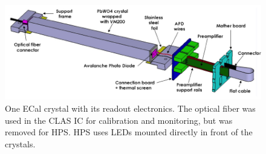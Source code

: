 \begin{figure}[ht]
    \includegraphics[width=\textwidth]{detector/figs/ecal_module}
    \caption{One ECal crystal with its readout electronics. The optical fiber was used in the CLAS IC for calibration and monitoring, but was removed for HPS. HPS uses LEDs mounted directly in front of the crystals.}
    \label{figure:svt_layout}
\end{figure}

